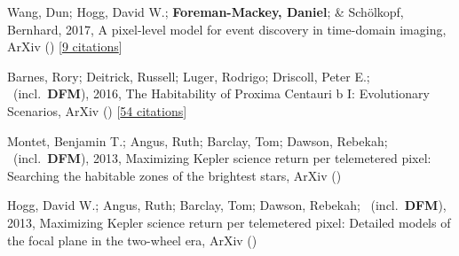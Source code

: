 \item[{\color{numcolor}\scriptsize4}] Wang, Dun; Hogg, David W.; \textbf{Foreman-Mackey, Daniel}; \& Sch{\"o}lkopf, Bernhard, 2017, A pixel-level model for event discovery in time-domain imaging, ArXiv () [\href{https://ui.adsabs.harvard.edu/abs/2017arXiv171002428W}{9 citations}]

\item[{\color{numcolor}\scriptsize3}] Barnes, Rory; Deitrick, Russell; Luger, Rodrigo; Driscoll, Peter E.; \etal\ (incl.\ \textbf{DFM}), 2016, The Habitability of Proxima Centauri b I: Evolutionary Scenarios, ArXiv () [\href{https://ui.adsabs.harvard.edu/abs/2016arXiv160806919B}{54 citations}]

\item[{\color{numcolor}\scriptsize2}] Montet, Benjamin T.; Angus, Ruth; Barclay, Tom; Dawson, Rebekah; \etal\ (incl.\ \textbf{DFM}), 2013, Maximizing Kepler science return per telemetered pixel: Searching the habitable zones of the brightest stars, ArXiv ()

\item[{\color{numcolor}\scriptsize1}] Hogg, David W.; Angus, Ruth; Barclay, Tom; Dawson, Rebekah; \etal\ (incl.\ \textbf{DFM}), 2013, Maximizing Kepler science return per telemetered pixel: Detailed models of the focal plane in the two-wheel era, ArXiv ()